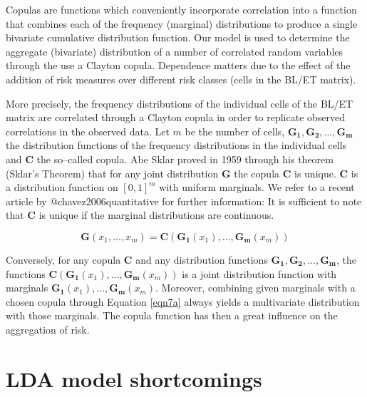 \documentclass[]{article}
\begin{document}
Copulas are functions which conveniently incorporate correlation into a
function that combines each of the frequency (marginal) distributions to
produce a single bivariate cumulative distribution function. Our model
is used to determine the aggregate (bivariate) distribution of a number
of correlated random variables through the use a Clayton copula.
Dependence matters due to the effect of the addition of risk measures
over different risk classes (cells in the BL/ET matrix). \medskip

More precisely, the frequency distributions of the individual cells of
the BL/ET matrix are correlated through a Clayton copula in order to
replicate observed correlations in the observed data. Let \(m\) be the
number of cells, \(\mathbf{G_1}, \mathbf{G_2},...,\mathbf{G_m}\) the
distribution functions of the frequency distributions in the individual
cells and \(\mathbf{C}\) the so--called copula. Abe Sklar proved in 1959
through his theorem (Sklar's Theorem) that for any joint distribution
\(\mathbf{G}\) the copula \(\mathbf{C}\) is unique. \(\mathbf{C}\) is a
distribution function on \([0,1]^{m}\) with uniform marginals. We refer
to a recent article by @chavez2006quantitative for further information:
It is sufficient to note that \(\mathbf{C}\) is unique if the marginal
distributions are continuous.

\singlespacing

\begin{equation}\label{eqn7a}
\mathbf{G}(x_1, \ldots, x_m) = \mathbf{C}\left(\mathbf{G_1}(x_1), \ldots, \mathbf{G_m}(x_m) \right)
\end{equation} \doublespacing

Conversely, for any copula \(\mathbf{C}\) and any distribution functions
\(\mathbf{G_1}, \mathbf{G_2},...,\mathbf{G_m}\), the functions
\(\mathbf{C}\left(\mathbf{G_1}(x_1), \ldots, \mathbf{G_m}(x_m) \right)\)
is a joint distribution function with marginals
\(\mathbf{G_1}(x_1), \ldots, \mathbf{G_m}(x_m)\). Moreover, combining
given marginals with a chosen copula through Equation \ref{eqn7a} always
yields a multivariate distribution with those marginals. The copula
function has then a great influence on the aggregation of risk.

\section{LDA model shortcomings}
\label{ssec:LDA model shortcomings}
\end{document}
